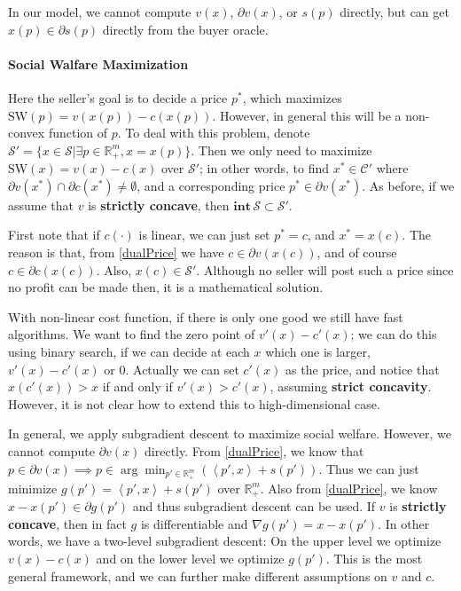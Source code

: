 \documentclass{article}
\newcommand{\ip}[2]{\left\langle #1, #2 \right \rangle}
\begin{document}
In our model, we cannot compute $v(x)$, $\partial v(x)$, or $s(p)$ directly, but can get $x(p)\in\partial s(p)$ directly from the buyer oracle.

\paragraph{Social Walfare Maximization}
Here the seller's goal is to decide a price $p^*$, which maximizes $\mathrm{SW}(p)=v(x(p))-c(x(p))$. However, in general this will be a non-convex function of $p$. To deal with this problem, denote $\mathcal{S}'=\{x\in\mathcal{S}|\exists p\in \mathbb{R}_+^m, x=x(p)\}$. Then we only need to maximize $\mathrm{SW}(x)=v(x)-c(x)$ over $\mathcal{S}'$; in other words, to find $x^*\in \mathcal{C'}$ where $\partial v(x^*)\cap\partial c(x^*)\ne\emptyset$, and a corresponding price $p^*\in\partial v(x^*)$. As before, if we assume that $v$ is \textbf{strictly concave}, then $\mathbf{int}\,\mathcal{S}\subset \mathcal{S}'$.

First note that if $c(\cdot)$ is linear, we can just set $p^*=c$, and $x^*=x(c)$. The reason is that, from \eqref{dualPrice} we have $c\in\partial v(x(c))$, and of course $c\in\partial c(x(c))$. Also, $x(c)\in \mathcal{S}'$. Although no seller will post such a price since no profit can be made then, it is a mathematical solution.

With non-linear cost function, if there is only one good we still have fast algorithms. We want to find the zero point of $v'(x)-c'(x)$; we can do this using binary search, if we can decide at each $x$ which one is larger, $v'(x)-c'(x)$ or $0$. Actually we can set $c'(x)$ as the price, and notice that $x(c'(x))>x$ if and only if $v'(x)>c'(x)$, assuming \textbf{strict concavity}. However, it is not clear how to extend this to high-dimensional case.

In general, we apply subgradient descent to maximize social welfare. However, we cannot compute $\partial v(x)$ directly. From \eqref{dualPrice}, we know that $p\in\partial v(x)\implies p \in \arg\min_{p'\in \mathbb{R}_+^m} ( \ip{p'}{x} + s(p') )$. Thus we can just minimize $g(p')=\ip{p'}{x} + s(p')$ over $\mathbb{R}_+^m$. Also from \eqref{dualPrice}, we know $x-x(p')\in\partial g(p')$ and thus subgradient descent can be used. If $v$ is \textbf{strictly concave}, then in fact $g$ is differentiable and $\nabla g(p')=x-x(p')$. In other words, we have a two-level subgradient descent: On the upper level we optimize $v(x)-c(x)$ and on the lower level we optimize $g(p')$. This is the most general framework, and we can further make different assumptions on $v$ and $c$.
\end{document}

